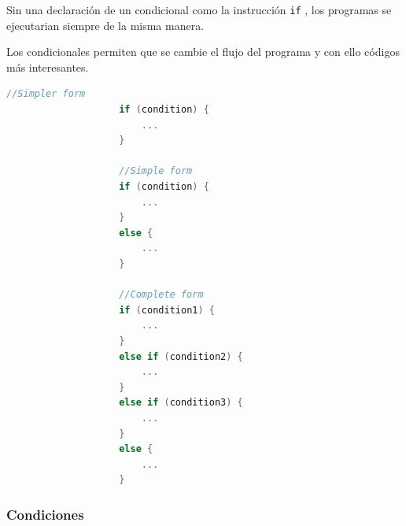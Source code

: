 \documentclass[12pt, fleqn]{report}                             %
\theoremstyle{break}                                            %
\newcommand{\textCode}[1]  { \texttt{#1} }                      %
\begin{document}
                Sin una declaración de un condicional como la instrucción \textCode{if}, los programas
                se ejecutarian siempre de la misma manera.
                
                Los condicionales permiten que se cambie el flujo del programa y con ello códigos
                más interesantes.

                \begin{lstlisting}[language=C++, gobble=20]
                    //Simpler form
                    if (condition) {
                        ...
                    }

                    //Simple form
                    if (condition) {
                        ...
                    }
                    else {
                        ...
                    }
                    
                    //Complete form
                    if (condition1) {
                        ...
                    }
                    else if (condition2) {
                        ...
                    }
                    else if (condition3) {
                        ...
                    }
                    else {
                        ...
                    }
                \end{lstlisting}


                \clearpage
                \subsubsection{Condiciones}
\end{document}
